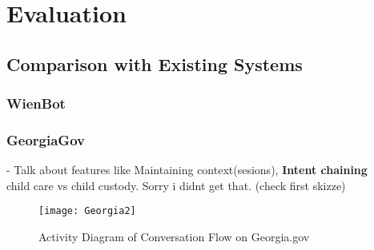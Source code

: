 \chapter{Evaluation}
\label{evaluation}

\section{Comparison with Existing Systems}


\subsection*{WienBot}

\subsection*{GeorgiaGov}



- Talk about features like Maintaining context(sesions), \textbf{Intent chaining}\\


child care
vs child custody. Sorry i didnt get that. (check first skizze)

\begin{figure}[p]

	\caption[Conversation Flow on Georgia.gov]{Activity Diagram of Conversation Flow on Georgia.gov}
	\centering %
	\texttt{[image: Georgia2]}
	\label{astah:georgiaActivity}
\end{figure}


